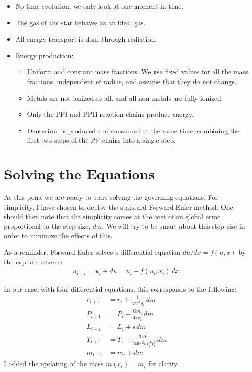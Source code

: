\documentclass[11pt,twocolumn]{article}
\begin{document}
\begin{itemize}
  \item No time evolution, we only look at one moment in time.
  \item The gas of the star behaves as an ideal gas.
  \item All energy transport is done through radiation.
  \item Energy production:
    \begin{itemize}
    \item Uniform and constant mass fractions. We use fixed values for 
      all the mass fractions, independent of radius, and assume that
      they do not change.
    \item Metals are not ionized at all, and all non-metals are fully
      ionized.
    \item Only the PPI and PPII reaction chains produce energy.
    \item Deuterium is produced and consumed at the same time,
      combining the first two steps of the PP chains into a single step.
    \end{itemize}
\end{itemize}



\section{Solving the Equations}
At this point we are ready to start solving the governing
equations. For simplicity, I have chosen to deploy the standard
Forward Euler method. One should then note that the simplicity comes
at the cost of an global error proportional to the step size, $dm$. We
will try to be smart about this step size in order to minimize the
effects of this. 

As a reminder, Forward Euler solves a differential equation $du/dx =
f(u,x)$ by the explicit scheme: 
\begin{align*}
  u_{i+i} = u_i + du = u_i + f(u_i,x_i)\,dx.
\end{align*}

In our case, with four differential equations, this corresponds to the
following:
\begin{align*}
  r_{i+1} &= r_i +  \frac{ 1 }{ 4\pi r_i^2\rho_i }\,dm\\
  P_{i+1} &= P_{i} - \frac{ Gm_i }{ 4\pi r^4_i }\,dm\\
  L_{i+1} &= L_i + \epsilon\,dm\\
  T_{i+1} &= T_i - \frac{ 3\kappa L_i }{ 256 \pi^2 \sigma r_i^4T_i^3
            }\,dm\\
  m_{i+1} &= m_i + dm
\end{align*}
I added the updating of the mass $m(r_i)=m_i$ for clarity.
\end{document}
